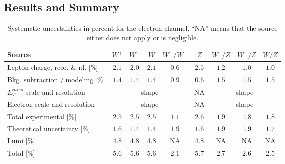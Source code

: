 \subsection{Results and Summary}

\begin{table}[htbp]
\centering
\small
\begin {tabular}  {lcccccccc}
\hline
Source & $W^+$ & $W^-$ & $W$ & $W^+/W^-$ & $Z$ & $W^+/Z$ & $W^-/Z$ & $W/Z$ \\
\hline
Lepton charge, reco. \& id. [\%] & $2.1$ & $2.0$ & $2.1$ & $0.6$ & $2.5$ & $1.2$ & $1.0$ & $1.0$ \\
Bkg. subtraction / modeling [\%] & $1.4$ & $1.4$ & $1.4$ & $0.9$ & $0.6$ & $1.5$ & $1.5$ & $1.5$ \\ 
$E_{T}^{miss}$ scale and resolution  & \multicolumn{4}{c}{shape}  & NA & \multicolumn{3}{c}{shape}  \\ 
Electron scale and resolution & \multicolumn{4}{c}{shape}  & NA & \multicolumn{3}{c}{shape}  \\ 
\hline
Total experimental [\%] & $2.5$ & $2.5$ & $2.5$ & $1.1$ & $2.6$ & $1.9$ & $1.8$ & $1.8$ \\
\hline
Theoretical uncertainty [\%] & $1.6$ & $1.4$ & $1.4$ & $1.9$ & $1.6$ & $1.9$ & $1.9$ & $1.7$ \\
\hline
Lumi [\%] & $4.8$ & $4.8$ & $4.8$ & NA & $4.8$ & NA & NA & NA \\
\hline
Total [\%] & $5.6$ & $5.6$ & $5.6$ & $2.1$ & $5.7$ & $2.7$ & $2.6$ & $2.5$ \\
\hline
\end {tabular} 
\caption[.]{ \label{tab:syst_el}
Systematic uncertainties in percent for the electron channel. ``NA'' means that the source either does not apply or is negligible.}
\end{table}


